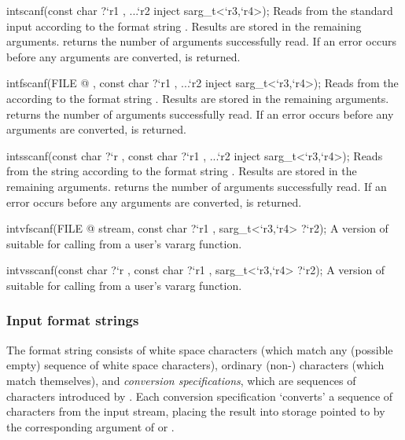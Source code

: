 \begin{defun2}{int}{scanf}{(const char {?}`r1 , ...`r2 inject sarg_t<`r3,`r4>);}
  Reads from the standard input according to the format string
  .  Results are stored in the remaining arguments.
   returns the number of arguments successfully read.  If
  an error occurs before any arguments are converted,  is
  returned.
\end{defun2}
\begin{defun2}{int}{fscanf}{(FILE @ , const char {?}`r1 , ...`r2 inject sarg_t<`r3,`r4>);}
  Reads from the  according to the format string
  .  Results are stored in the remaining arguments.
   returns the number of arguments successfully read.  If
  an error occurs before any arguments are converted,  is
  returned.
\end{defun2}
\begin{defun2}{int}{sscanf}{(const char {?}`r , const char {?}`r1 , ...`r2 inject sarg_t<`r3,`r4>);}
  Reads from the string  according to the format string
  .  Results are stored in the remaining arguments.
   returns the number of arguments successfully read.  If
  an error occurs before any arguments are converted,  is
  returned.
\end{defun2}
\begin{defun2}{int}{vfscanf}{(FILE @ stream, const char {?}`r1 , sarg_t<`r3,`r4> {?}`r2);}
  A version of  suitable for calling from a user's
  vararg function.
\end{defun2}
\begin{defun2}{int}{vsscanf}{(const char {?}`r , const char {?}`r1 , sarg_t<`r3,`r4> {?}`r2);}
  A version of  suitable for calling from a user's
  vararg function.
\end{defun2}

\subsubsection*{Input format strings}

The format string consists of white space characters (which match any
(possible empty) sequence of white space characters), ordinary
(non-\code{\%}) characters (which match themselves), and \emph{conversion
specifications}, which are sequences of characters introduced by
\code{\%}.  Each conversion specification `converts' a sequence of
characters from the input stream, placing the result into storage
pointed to by the corresponding argument of  or
.

